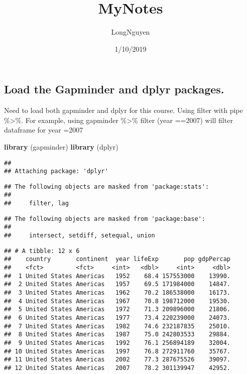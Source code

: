 \documentclass[]{article}
\title{MyNotes}
\author{LongNguyen}
\date{1/10/2019}
\newenvironment{Shaded}{\begin{snugshade}}{\end{snugshade}}
\newcommand{\KeywordTok}[1]{\textcolor[rgb]{0.13,0.29,0.53}{\textbf{#1}}}
\newcommand{\StringTok}[1]{\textcolor[rgb]{0.31,0.60,0.02}{#1}}
\newcommand{\OperatorTok}[1]{\textcolor[rgb]{0.81,0.36,0.00}{\textbf{#1}}}
\newcommand{\NormalTok}[1]{#1}
\begin{document}
\maketitle

\subsection{Load the Gapminder and dplyr
packages.}\label{load-the-gapminder-and-dplyr-packages.}

Need to load both gapminder and dplyr for this course. Using filter with
pipe \%\textgreater{}\%. For example, using gapminder \%\textgreater{}\%
filter (year ==2007) will filter dataframe for year =2007

\begin{Shaded}
\begin{Highlighting}[]
\KeywordTok{library}\NormalTok{ (gapminder)}
\KeywordTok{library}\NormalTok{ (dplyr)}
\end{Highlighting}
\end{Shaded}

\begin{verbatim}
## 
## Attaching package: 'dplyr'
\end{verbatim}

\begin{verbatim}
## The following objects are masked from 'package:stats':
## 
##     filter, lag
\end{verbatim}

\begin{verbatim}
## The following objects are masked from 'package:base':
## 
##     intersect, setdiff, setequal, union
\end{verbatim}

\begin{Shaded}
\end{Shaded}

\begin{verbatim}
## # A tibble: 12 x 6
##    country       continent  year lifeExp       pop gdpPercap
##    <fct>         <fct>     <int>   <dbl>     <int>     <dbl>
##  1 United States Americas   1952    68.4 157553000    13990.
##  2 United States Americas   1957    69.5 171984000    14847.
##  3 United States Americas   1962    70.2 186538000    16173.
##  4 United States Americas   1967    70.8 198712000    19530.
##  5 United States Americas   1972    71.3 209896000    21806.
##  6 United States Americas   1977    73.4 220239000    24073.
##  7 United States Americas   1982    74.6 232187835    25010.
##  8 United States Americas   1987    75.0 242803533    29884.
##  9 United States Americas   1992    76.1 256894189    32004.
## 10 United States Americas   1997    76.8 272911760    35767.
## 11 United States Americas   2002    77.3 287675526    39097.
## 12 United States Americas   2007    78.2 301139947    42952.
\end{verbatim}
\end{document}
